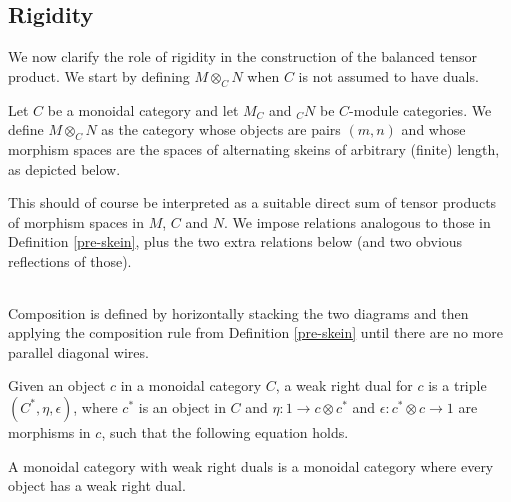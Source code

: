 \subsection{Rigidity}

We now clarify the role of rigidity in the construction of the balanced tensor product. We start by defining $M\otimes_C N$ when $C$ is not assumed to have duals.

\begin{definition}\label{pre-skein_no-duals}

Let $C$ be a monoidal category and let $M_C$ and $_{C}N$ be $C$-module categories. We define $M\otimes_C N$ as the category whose objects are pairs $(m,n)$ and whose morphism spaces are the spaces of alternating skeins of arbitrary (finite) length, as depicted below.

\begin{center}\end{center}
This should of course be interpreted as a suitable direct sum of tensor products of morphism spaces in $M$, $C$ and $N$. We impose relations analogous to those in Definition \ref{pre-skein}, plus the two extra relations below (and two obvious reflections of those).


\begin{center}\begin{tabular}{l}
 \\

\end{tabular}\end{center}

Composition is defined by horizontally stacking the two diagrams and then applying the composition rule from Definition \ref{pre-skein} until there are no more parallel diagonal wires.\end{definition}

\begin{definition}
 
Given an object $c$ in a monoidal category $C$, a weak right dual for $c$ is a triple $(C^*,\eta,\epsilon)$, where $c^*$ is an object in $C$ and $\eta:1\to c\otimes c^*$ and $\epsilon:c^*\otimes c\to 1$ are morphisms in $c$, such that the following equation holds.

\begin{center}
 
\end{center}

A monoidal category with weak right duals is a monoidal category where every object has a weak right dual.\end{definition}

